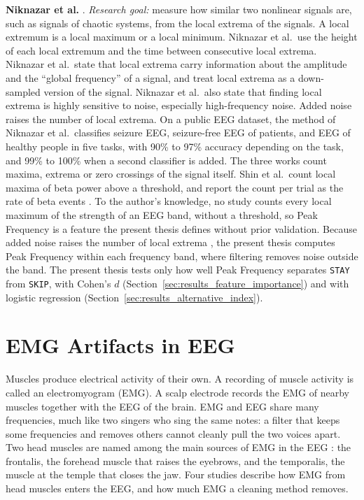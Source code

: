\documentclass[12pt,a4paper]{report}
\begin{document}
\textbf{Niknazar et al.} \cite{niknazar_new_2018}. \emph{Research goal:} measure how similar two nonlinear signals are, such as signals of chaotic systems, from the local extrema of the signals. A local extremum is a local maximum or a local minimum. Niknazar et al.\ use the height of each local extremum and the time between consecutive local extrema. Niknazar et al.\ state that local extrema carry information about the amplitude and the ``global frequency'' of a signal, and treat local extrema as a down-sampled version of the signal. Niknazar et al.\ also state that finding local extrema is highly sensitive to noise, especially high-frequency noise. Added noise raises the number of local extrema. On a public EEG dataset, the method of Niknazar et al.\ classifies seizure EEG, seizure-free EEG of patients, and EEG of healthy people in five tasks, with 90\% to 97\% accuracy depending on the task, and 99\% to 100\% when a second classifier is added.
The three works count maxima, extrema or zero crossings of the signal itself. Shin et al.\ count local maxima of beta power above a threshold, and report the count per trial as the rate of beta events \cite{shin_rate_2017}. To the author's knowledge, no study counts every local maximum of the strength of an EEG band, without a threshold, so Peak Frequency is a feature the present thesis defines without prior validation. Because added noise raises the number of local extrema \cite{niknazar_new_2018}, the present thesis computes Peak Frequency within each frequency band, where filtering removes noise outside the band. The present thesis tests only how well Peak Frequency separates \texttt{STAY} from \texttt{SKIP}, with Cohen's \(d\) (Section~\ref{sec:results_feature_importance}) and with logistic regression (Section~\ref{sec:results_alternative_index}).

\section{EMG Artifacts in EEG}
\label{sec:lit_emg}
Muscles produce electrical activity of their own. A recording of muscle activity is called an electromyogram (EMG). A scalp electrode records the EMG of nearby muscles together with the EEG of the brain. EMG and EEG share many frequencies, much like two singers who sing the same notes: a filter that keeps some frequencies and removes others cannot cleanly pull the two voices apart. Two head muscles are named among the main sources of EMG in the EEG \cite{goncharova_emg_2003, yilmaz_facial_2019}: the frontalis, the forehead muscle that raises the eyebrows, and the temporalis, the muscle at the temple that closes the jaw. Four studies describe how EMG from head muscles enters the EEG, and how much EMG a cleaning method removes.
\end{document}
